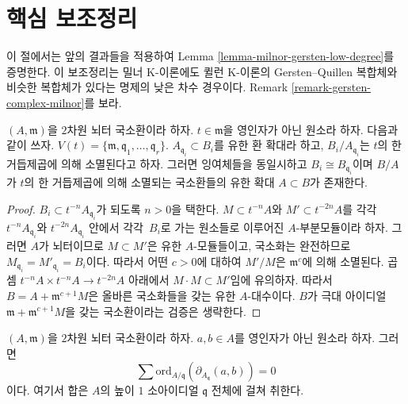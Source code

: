 




\section{핵심 보조정리}
\label{section-key-lemma}

\noindent
이 절에서는 앞의 결과들을 적용하여 Lemma
\ref{lemma-milnor-gersten-low-degree}를 증명한다. 이 보조정리는 밀너
K-이론에도 퀼런 K-이론의 Gersten--Quillen 복합체와 비슷한 복합체가
있다는 명제의 낮은 차수 경우이다. Remark
\ref{remark-gersten-complex-milnor}를 보라.

\begin{lemma}
\label{lemma-perpare-key}
$(A, \mathfrak m)$을 $2$차원 뇌터 국소환이라 하자.
$t \in \mathfrak m$을 영인자가 아닌 원소라 하자. 다음과 같이 쓰자.
$V(t) = \{\mathfrak m, \mathfrak q_1, \ldots, \mathfrak q_r\}$.
$A_{\mathfrak q_i} \subset B_i$를 유한 환 확대라 하고,
$B_i/A_{\mathfrak q_i}$는 $t$의 한 거듭제곱에 의해 소멸된다고 하자.
그러면 잉여체들을 동일시하고 $B_i \cong B_{\mathfrak q_i}$이며
$B/A$가 $t$의 한 거듭제곱에 의해 소멸되는 국소환들의 유한 확대
$A \subset B$가 존재한다.
\end{lemma}

\begin{proof}
$B_i \subset t^{-n}A_{\mathfrak q_i}$가 되도록 $n > 0$을 택한다.
$M \subset t^{-n}A$와 $M' \subset t^{-2n}A$를 각각\ $t^{-n}A_{\mathfrak q_i}$와
$t^{-2n}A_{\mathfrak q_i}$ 안에서 각각\ $B_i$로
가는 원소들로 이루어진 $A$-부분모듈이라 하자. 그러면 $A$가
뇌터이므로 $M \subset M'$은 유한 $A$-모듈들이고, 국소화는 완전하므로
$M_{\mathfrak q_i} = M'_{\mathfrak q_i} = B_i$이다. 따라서 어떤
$c > 0$에 대하여 $M'/M$은 $\mathfrak m^c$에 의해 소멸된다.
곱셈 $t^{-n}A \times t^{-n}A \to t^{-2n}A$ 아래에서
$M \cdot M \subset M'$임에 유의하자. 따라서
$B = A + \mathfrak m^{c + 1}M$은 올바른 국소화들을 갖는 유한
$A$-대수이다. $B$가 극대 아이디얼
$\mathfrak m + \mathfrak m^{c + 1}M$을 갖는 국소환이라는 검증은
생략한다.
\end{proof}

\begin{lemma}
\label{lemma-key-nonzerodivisors}
$(A, \mathfrak m)$을 $2$차원 뇌터 국소환이라 하자.
$a, b \in A$를 영인자가 아닌 원소라 하자. 그러면
$$
\sum
\text{ord}_{A/\mathfrak q}(\partial_{A_{\mathfrak q}}(a, b))
=
0
$$
이다. 여기서 합은 $A$의 높이 $1$ 소아이디얼 $\mathfrak q$ 전체에
걸쳐 취한다.
\end{lemma}

